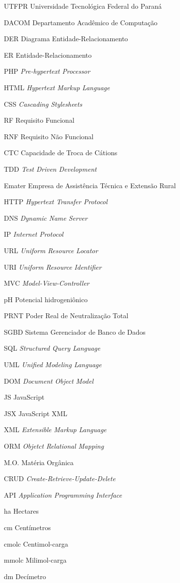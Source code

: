 
\begin{siglas}
    \item[UTFPR] Universidade Tecnológica Federal do Paraná
    \item[DACOM] Departamento Acadêmico de Computação
    \item[DER] Diagrama Entidade-Relacionamento
    \item[ER] Entidade-Relacionamento
    \item[PHP] \textit{Pre-hypertext Processor}
    \item[HTML] \textit{Hypertext Markup Language}
    \item[CSS] \textit{Cascading Stylesheets}
    \item[RF] Requisito Funcional 
    \item[RNF] Requisito Não Funcional 
    \item[CTC] Capacidade de Troca de Cátions 
    \item[TDD] \textit{Test Driven Development}
    \item[Emater] Empresa de Assistência Técnica e Extensão Rural
    \item[HTTP] \textit{Hypertext Transfer Protocol}
    \item[DNS] \textit{Dynamic Name Server}
    \item[IP] \textit{Internet Protocol}
    \item[URL] \textit{Uniform Resource Locator}
    \item[URI] \textit{Uniform Resource Identifier}
    \item[MVC] \textit{Model-View-Controller}
    \item[pH] Potencial hidrogeniônico
    \item[PRNT] Poder Real de Neutralização Total
    \item[SGBD] Sistema Gerenciador de Banco de Dados
    \item[SQL] \textit{Structured Query Language}
    \item[UML] \textit{Unified Modeling Language}
    \item[DOM] \textit{Document Object Model}
    \item[JS] JavaScript
    \item[JSX] JavaScript XML
    \item[XML] \textit{Extensible Markup Language}
    \item[ORM] \textit{Objetct Relational Mapping}
    \item[M.O.] Matéria Orgânica
    \item[CRUD] \textit{Create-Retrieve-Update-Delete}
    \item[API] \textit{Application Programming Interface}
    
    \item[ha] Hectares
    \item[cm] Centímetros
    \item[cmolc] Centimol-carga
    \item[mmolc] Milimol-carga
    \item[dm] Decímetro
\end{siglas}
